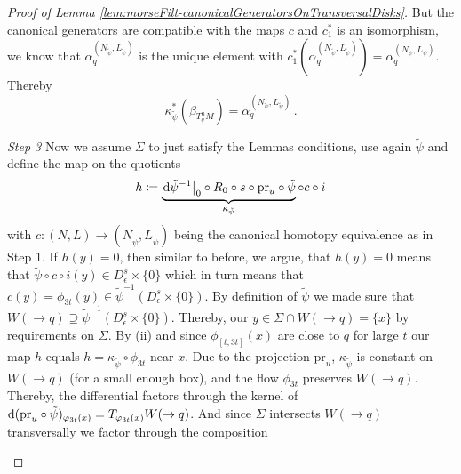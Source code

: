 \begin{proof}[Proof of Lemma \ref{lem:morseFilt-canonicalGeneratorsOnTransversalDisks}]
But the canonical generators are compatible with the maps $c$ and $c_1^*$ is an isomorphism, we know that $\alpha_q^{(N_{\tilde{\psi}},L_{\tilde{\psi}})}$ is the unique element with $c_1^*(\alpha_q^{(N_{\tilde{\psi}},L_{\tilde{\psi}})})=\alpha_q^{(N_{{\psi}},L_{{\psi}})}$. Thereby 
\begin{equation*}
	\kappa_{\tilde{\psi}}^*(\beta_{T^u_qM})=\alpha_q^{(N_{\tilde{\psi}},L_{\tilde{\psi}})}\,.
\end{equation*}

\textit{Step 3} Now we assume $\Sigma$ to just satisfy the Lemmas conditions, use again $\tilde{\psi}$ and define the map on the quotients
 \begin{equation*}
	h\coloneq \underbrace{\left.\mathop{}\!\mathrm{d} \tilde{\psi}^{-1}\right|_{0}\circ R_0\circ s\circ \mathrm{pr}_u\circ \tilde{\psi}}_{\kappa_{\tilde{\psi}}}\circ c\circ i
 \end{equation*} with $c:(N,L)\to (N_{\tilde{\psi}},L_{\tilde{\psi}})$ being the canonical homotopy equivalence as in Step 1. If $h(y)=0$, then similar to before, we argue, that $h(y)=0$ means that $\tilde{\psi}\circ c\circ i(y)\in D^s_\epsilon\times \{0\}$ which in turn means that $c(y)=\phi_{3t}(y)\in \tilde{\psi}^{-1}(D^s_\epsilon\times\{0\})$. By definition of $\tilde{\psi}$ we made sure that $W(\to q)\supseteq \tilde{\psi}^{-1}(D^s_\epsilon\times\{0\})$. 
 Thereby, our $y\in \Sigma\cap W(\to q)=\{x\}$ by requirements on $\Sigma$. By (ii) and since $\phi_{[t,3t]}(x)$ are close to $q$ for large $t$ our map $h$ equals $h=\kappa_{\tilde{\psi}}\circ \phi_{3t}$ near $x$. 
 Due to the projection $\mathrm{pr}_u$, $\kappa_{\tilde{\psi}}$ is constant on $W(\to q)$ (for a small enough box), and the flow $\phi_{3t}$ preserves $W(\to q)$. Thereby, the differential factors through the kernel of $\mathop{}\!\mathrm{d}( \mathrm{pr}_u \circ \tilde{\psi})_{\varphi_{3t}(x)}=T_{\varphi_{3t}(x)}W(\to q)$. And since $\Sigma$ intersects $W(\to q)$ transversally  we factor through the composition

 \begin{center}
 \end{center}

\end{proof}
